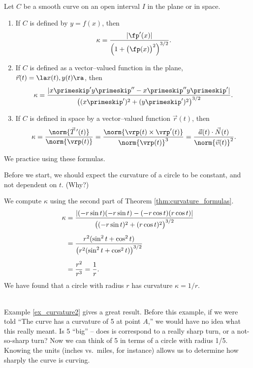 {Let $C$ be a smooth curve on an open interval $I$ in the plane or in space.
\begin{enumerate}
	\item If $C$ is defined by $y=f(x)$, then 
	$$\kappa = \frac{|\fp'(x)|}{\Big(1+\big(\fp(x)\big)^2\Big)^{3/2}}.$$
	\item	If $C$ is defined as a vector--valued function in the plane, $\vec r(t) = \la x(t), y(t)\ra$, then
	$$\kappa = \frac{|x\primeskip'y\primeskip''-x\primeskip''y\primeskip'|}{\big((x\primeskip')^2+(y\primeskip')^2\big)^{3/2}}.$$
	\item If $C$ is defined in space by a vector--valued function $\vec r(t)$, then
$$\kappa = \frac{\norm{\vec T\,'(t)}}{\norm{\vrp(t)}} = \frac{\norm{\vrp(t)\times\vrp'(t)}}{\norm{\vrp(t)}^3} = \frac{\vec a(t)\cdot \vec N(t)}{\norm{\vec v(t)}^2}.$$
\end{enumerate}
}

We practice using these formulas.\\

{Before we start, we should expect the curvature of a circle to be constant, and not dependent on $t$. (Why?)

We compute $\kappa$ using the second part of Theorem \ref{thm:curvature_formulas}.
\begin{align*}
\kappa &= \frac{|(-r\sin t)(-r\sin t) - (-r\cos t)(r\cos t)|}{\big( (-r\sin t)^2+(r\cos t)^2\big)^{3/2}} \\
			&= \rule{0pt}{20pt}\frac{r^2(\sin^2t+\cos^2t)}{\big(r^2(\sin^2t+\cos^2t)\big)^{3/2}}\\
			&= \rule{0pt}{20pt}\frac{r^2}{r^3} = \frac1r.
\end{align*}
We have found that a circle with radius $r$ has curvature $\kappa = 1/r$.
}\\

Example \ref{ex_curvature2} gives a great result. Before this example, if we were told ``The curve has a curvature of 5 at point $A$,'' we would have no idea what this really meant. Is 5 ``big'' -- does is correspond to a really sharp turn, or a not-so-sharp turn? Now we can think of 5 in terms of a circle with radius 1/5. Knowing the units (inches vs.\ miles, for instance) allows us to determine how sharply the curve is curving.
\\


